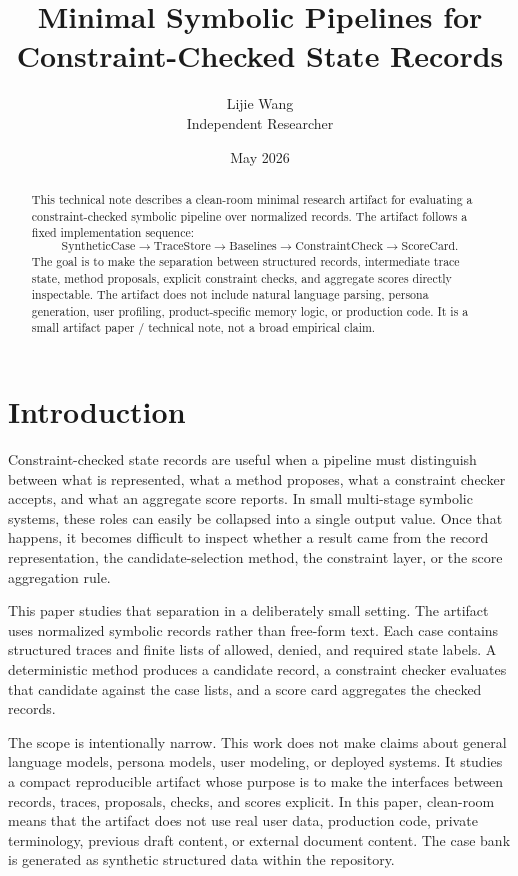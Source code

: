 \documentclass[11pt]{article}
\title{Minimal Symbolic Pipelines for Constraint-Checked State Records}
\author{Lijie Wang\\Independent Researcher}
\date{May 2026}
\begin{document}
\maketitle

\begin{abstract}
This technical note describes a clean-room minimal research artifact for
evaluating a constraint-checked symbolic pipeline over normalized records. The
artifact follows a fixed implementation sequence:
\[
\text{SyntheticCase} \rightarrow \text{TraceStore} \rightarrow
\text{Baselines} \rightarrow \text{ConstraintCheck} \rightarrow
\text{ScoreCard}.
\]
The goal is to make the separation between structured records, intermediate
trace state, method proposals, explicit constraint checks, and aggregate scores
directly inspectable. The artifact does not include natural language parsing,
persona generation, user profiling, product-specific memory logic, or
production code. It is a small artifact paper / technical note, not a broad
empirical claim.
\end{abstract}

\section{Introduction}

Constraint-checked state records are useful when a pipeline must distinguish
between what is represented, what a method proposes, what a constraint checker
accepts, and what an aggregate score reports. In small multi-stage symbolic
systems, these roles can easily be collapsed into a single output value. Once
that happens, it becomes difficult to inspect whether a result came from the
record representation, the candidate-selection method, the constraint layer, or
the score aggregation rule.

This paper studies that separation in a deliberately small setting. The
artifact uses normalized symbolic records rather than free-form text. Each case
contains structured traces and finite lists of allowed, denied, and required
state labels. A deterministic method produces a candidate record, a constraint
checker evaluates that candidate against the case lists, and a score card
aggregates the checked records.

The scope is intentionally narrow. This work does not make claims about
general language models, persona models, user modeling, or deployed systems.
It studies a compact reproducible artifact whose purpose is to make the
interfaces between records, traces, proposals, checks, and scores explicit.
In this paper, clean-room means that the artifact does not use real user data,
production code, private terminology, previous draft content, or external
document content. The case bank is generated as synthetic structured data
within the repository.
\end{document}
